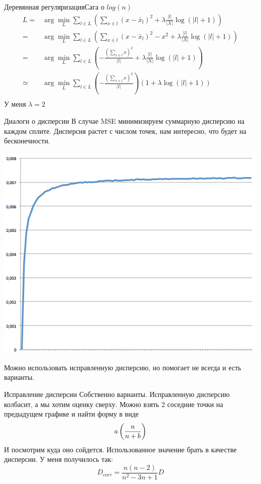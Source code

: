 \documentclass[14pt, fleqn, xcolor={dvipsnames, table}]{beamer}
\begin{document}
\begin{frame}{Деревянная регуляризация}{Сага о $log(n)$}
$$\begin{array}{rl}
L =& \arg \min_L \sum_{l \in L} \left(\sum_{x \in l}(x - \bar{x}_l)^2 + \lambda \frac{|l|}{|X|} \log(|l| + 1)\right) \\
= & \arg \min_L \sum_{l \in L} \left(\sum_{x \in l}(x - \bar{x}_l)^2 - x^2+ \lambda \frac{|l|}{|X|} \log(|l| + 1)\right) \\
= & \arg \min_L \sum_{l \in L} \left(- \frac{\left(\sum_{x \in l}x\right)^2}{|l|} + \lambda \frac{|l|}{|X|} \log(|l| + 1)\right) \\
\simeq & \arg \min_L \sum_{l \in L} \left(- \frac{\left(\sum_{x \in l}x\right)^2}{|l|}\right)\left(1 + \lambda \log(|l| + 1)\right) \\
\end{array}$$
У меня $\lambda = 2$
\end{frame}

\begin{frame}{Диалоги о дисперсии}
\small
В случае MSE минимизируем суммарную дисперсию на каждом сплите. Дисперсия растет с числом точек, нам интересно, что будет на бесконечности.
\begin{center}
\includegraphics[height=0.5\textheight]{D.png} 
\end{center}
Можно использовать исправленную дисперсию, но помогает не всегда и есть варианты.
\end{frame}

\begin{frame}{Исправление дисперсии}
Собственно варианты. Исправленную дисперсию колбасит, а мы хотим оценку сверху. Можно взять 2 соседние точки на предыдущем графике и найти форму в виде
$$
a\left(n \over n + b\right)
$$
И посмотрим куда оно сойдется. Использованное значение брать в качестве дисперсии. У меня получилось так:
$$
D_{corr} = \frac{n (n - 2)}{n^2 - 3n +1} D
$$
\end{frame}
\end{document}
